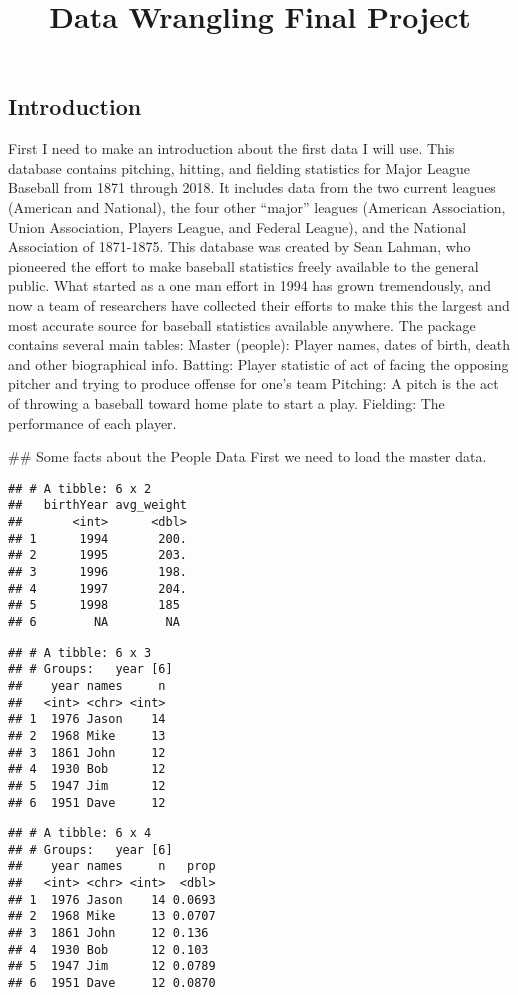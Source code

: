 \documentclass[
  12pt,
]{article}
\title{Data Wrangling Final Project}
\author{}
\date{\vspace{-2.5em}}
\begin{document}
\maketitle

\hypertarget{introduction}{%
\subsection{Introduction}\label{introduction}}

First I need to make an introduction about the first data I will use.
This database contains pitching, hitting, and fielding statistics for
Major League Baseball from 1871 through 2018. It includes data from the
two current leagues (American and National), the four other ``major''
leagues (American Association, Union Association, Players League, and
Federal League), and the National Association of 1871-1875. This
database was created by Sean Lahman, who pioneered the effort to make
baseball statistics freely available to the general public. What started
as a one man effort in 1994 has grown tremendously, and now a team of
researchers have collected their efforts to make this the largest and
most accurate source for baseball statistics available anywhere. The
package contains several main tables: Master (people): Player names,
dates of birth, death and other biographical info. Batting: Player
statistic of act of facing the opposing pitcher and trying to produce
offense for one's team Pitching: A pitch is the act of throwing a
baseball toward home plate to start a play. Fielding: The performance of
each player.

\#\# Some facts about the People Data First we need to load the master
data.

\begin{verbatim}
## # A tibble: 6 x 2
##   birthYear avg_weight
##       <int>      <dbl>
## 1      1994       200.
## 2      1995       203.
## 3      1996       198.
## 4      1997       204.
## 5      1998       185 
## 6        NA        NA
\end{verbatim}

\begin{verbatim}
## # A tibble: 6 x 3
## # Groups:   year [6]
##    year names     n
##   <int> <chr> <int>
## 1  1976 Jason    14
## 2  1968 Mike     13
## 3  1861 John     12
## 4  1930 Bob      12
## 5  1947 Jim      12
## 6  1951 Dave     12
\end{verbatim}

\begin{verbatim}
## # A tibble: 6 x 4
## # Groups:   year [6]
##    year names     n   prop
##   <int> <chr> <int>  <dbl>
## 1  1976 Jason    14 0.0693
## 2  1968 Mike     13 0.0707
## 3  1861 John     12 0.136 
## 4  1930 Bob      12 0.103 
## 5  1947 Jim      12 0.0789
## 6  1951 Dave     12 0.0870
\end{verbatim}
\end{document}
